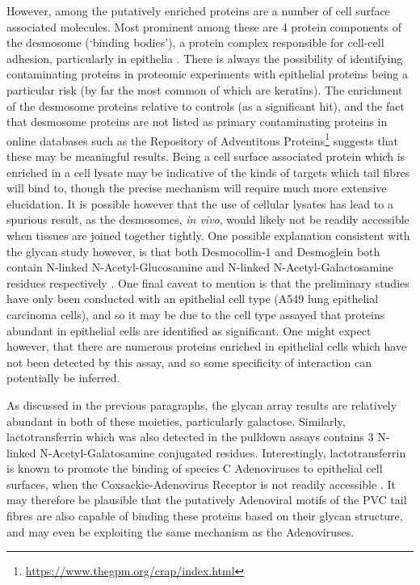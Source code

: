 However, among the putatively enriched proteins are a number of cell surface associated molecules. Most prominent among these are 4 protein components of the desmosome (`binding bodies'), a protein complex responsible for cell-cell adhesion, particularly in epithelia \citep{Delva2009}. There is always the possibility of identifying contaminating proteins in proteomic experiments with epithelial proteins being a particular risk (by far the most common of which are keratins). The enrichment of the desmosome proteins relative to controls (as a significant hit), and the fact that desmosome proteins are not listed as primary contaminating proteins in online databases such as the Repository of Adventitous Proteins\footnote{\url{https://www.thegpm.org/crap/index.html}} suggests that these may be meaningful results. Being a cell surface associated protein which is enriched in a cell lysate may be indicative of the kinds of targets which tail fibres will bind to, though the precise mechanism will require much more extensive elucidation. It is possible however that the use of cellular lysates has lead to a spurious result, as the desmosomes, \emph{in vivo}, would likely not be readily accessible when tissues are joined together tightly. One possible explanation consistent with the glycan study however, is that both Desmocollin-1 and Desmoglein both contain N-linked N-Acetyl-Glucosamine and N-linked N-Acetyl-Galactosamine residues respectively \citep{Ramachandran2006}. One final caveat to mention is that the preliminary studies have only been conducted with an epithelial cell type (A549 lung epithelial carcinoma cells), and so it may be due to the cell type assayed that proteins abundant in epithelial cells are identified as significant. One might expect however, that there are numerous proteins enriched in epithelial cells which have not been detected by this assay, and so some specificity of interaction can potentially be inferred.

As discussed in the previous paragraphs, the glycan array results are relatively abundant in both of these moieties, particularly galactose. Similarly, lactotransferrin which was also detected in the pulldown assays contains 3 N-linked N-Acetyl-Galatosamine conjugated residues. Interestingly, lactotransferrin is known to promote the binding of species C Adenoviruses to epithelial cell surfaces, when the Coxsackie-Adenovirus Receptor is not readily accessible \citep{Johansson2007}. It may therefore be plausible that the putatively Adenoviral motifs of the PVC tail fibres are also capable of binding these proteins based on their glycan structure, and may even be exploiting the same mechanism as the Adenoviruses.



